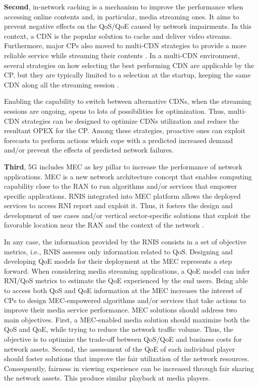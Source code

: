 \textbf{Second}, in-network caching is a mechanism to improve the performance when accessing online contents and, in particular, media streaming ones. It aims to prevent negative effects on the QoS/QoE caused by network impairments. In this context, a CDN is the popular solution to cache and deliver video streams. Furthermore, major CPs also moved to multi-CDN strategies to provide a more reliable service while streaming their contents \cite{adhikari2012, adhikari2012-2}. In a multi-CDN environment, several strategies on how selecting the best performing CDN are applicable by the CP, but they are typically limited to a selection at the startup, keeping the same CDN along all the streaming session \cite{adhikari2015}.

Enabling the capability to switch between alternative CDNs, when the streaming sessions are ongoing, opens to lots of possibilities for optimization.
Thus, multi-CDN strategies can be designed to optimize CDNs utilization and reduce the resultant OPEX for the CP. Among these strategies, proactive ones can exploit forecasts to perform actions which cope with a predicted increased demand and/or prevent the effects of predicted network failures.

\textbf{Third}, 5G includes MEC \cite{etsi2019} as key pillar to increase the performance of network applications. MEC is a new network architecture concept that enables computing capability close to the RAN to run algorithms and/or services that empower specific applications. RNIS integrated into MEC platform allows the deployed services to access RNI report and exploit it. Thus, it fosters the design and development of use cases and/or vertical sector-specific solutions that exploit the favorable location near the RAN and the context of the network \cite{Tan2018, Martin2019}.

In any case, the information provided by the RNIS consists in a set of objective metrics, i.e., RNIS assesses only information related to QoS. Designing and developing QoE models for their deployment at the MEC represents a step forward. When considering media streaming applications, a QoE model can infer RNI/QoS metrics to estimate the QoE experienced by the end users. Being able to access both QoS and QoE information at the MEC increases the interest of CPs to design MEC-empowered algorithms and/or services that take actions to improve their media service performance. MEC solutions should address two main objectives. First, a MEC-enabled media solution should maximize both the QoS and QoE, while trying to reduce the network traffic volume. Thus, the objective is to optimize the trade-off between QoS/QoE and business costs for network assets. Second, the assessment of the QoE of each individual player should foster solutions that improve the fair utilization of the network resources. Consequently, fairness in viewing experience can be increased through fair sharing the network assets. This produce similar playback at media players.

